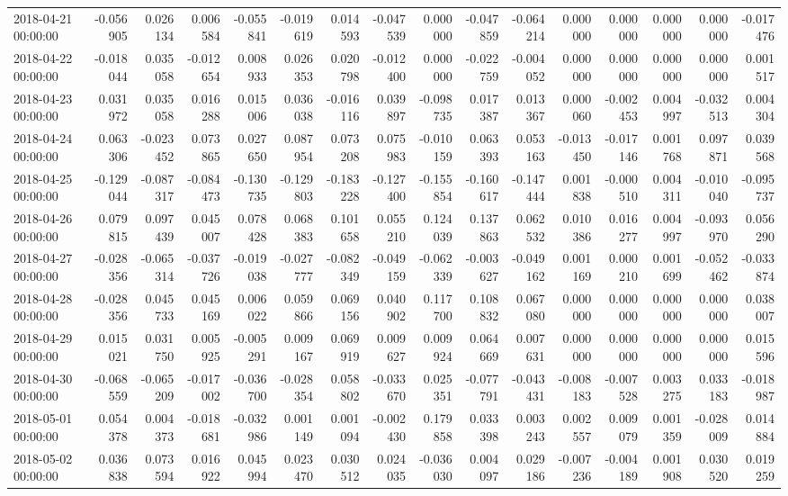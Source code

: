\begin{tabular}{lrrrrrrrrrrrrrrr}
2018-04-21 00:00:00 & -0.056905 & 0.026134 & 0.006584 & -0.055841 & -0.019619 & 0.014593 & -0.047539 & 0.000000 & -0.047859 & -0.064214 & 0.000000 & 0.000000 & 0.000000 & 0.000000 & -0.017476 \\
2018-04-22 00:00:00 & -0.018044 & 0.035058 & -0.012654 & 0.008933 & 0.026353 & 0.020798 & -0.012400 & 0.000000 & -0.022759 & -0.004052 & 0.000000 & 0.000000 & 0.000000 & 0.000000 & 0.001517 \\
2018-04-23 00:00:00 & 0.031972 & 0.035058 & 0.016288 & 0.015006 & 0.036038 & -0.016116 & 0.039897 & -0.098735 & 0.017387 & 0.013367 & 0.000060 & -0.002453 & 0.004997 & -0.032513 & 0.004304 \\
2018-04-24 00:00:00 & 0.063306 & -0.023452 & 0.073865 & 0.027650 & 0.087954 & 0.073208 & 0.075983 & -0.010159 & 0.063393 & 0.053163 & -0.013450 & -0.017146 & 0.001768 & 0.097871 & 0.039568 \\
2018-04-25 00:00:00 & -0.129044 & -0.087317 & -0.084473 & -0.130735 & -0.129803 & -0.183228 & -0.127400 & -0.155854 & -0.160617 & -0.147444 & 0.001838 & -0.000510 & 0.004311 & -0.010040 & -0.095737 \\
2018-04-26 00:00:00 & 0.079815 & 0.097439 & 0.045007 & 0.078428 & 0.068383 & 0.101658 & 0.055210 & 0.124039 & 0.137863 & 0.062532 & 0.010386 & 0.016277 & 0.004997 & -0.093970 & 0.056290 \\
2018-04-27 00:00:00 & -0.028356 & -0.065314 & -0.037726 & -0.019038 & -0.027777 & -0.082349 & -0.049159 & -0.062339 & -0.003627 & -0.049162 & 0.001169 & 0.000210 & 0.001699 & -0.052462 & -0.033874 \\
2018-04-28 00:00:00 & -0.028356 & 0.045733 & 0.045169 & 0.006022 & 0.059866 & 0.069156 & 0.040902 & 0.117700 & 0.108832 & 0.067080 & 0.000000 & 0.000000 & 0.000000 & 0.000000 & 0.038007 \\
2018-04-29 00:00:00 & 0.015021 & 0.031750 & 0.005925 & -0.005291 & 0.009167 & 0.069919 & 0.009627 & 0.009924 & 0.064669 & 0.007631 & 0.000000 & 0.000000 & 0.000000 & 0.000000 & 0.015596 \\
2018-04-30 00:00:00 & -0.068559 & -0.065209 & -0.017002 & -0.036700 & -0.028354 & 0.058802 & -0.033670 & 0.025351 & -0.077791 & -0.043431 & -0.008183 & -0.007528 & 0.003275 & 0.033183 & -0.018987 \\
2018-05-01 00:00:00 & 0.054378 & 0.004373 & -0.018681 & -0.032986 & 0.001149 & 0.001094 & -0.002430 & 0.179858 & 0.033398 & 0.003243 & 0.002557 & 0.009079 & 0.001359 & -0.028009 & 0.014884 \\
2018-05-02 00:00:00 & 0.036838 & 0.073594 & 0.016922 & 0.045994 & 0.023470 & 0.030512 & 0.024035 & -0.036030 & 0.004097 & 0.029186 & -0.007236 & -0.004189 & 0.001908 & 0.030520 & 0.019259 \\

\end{tabular}
